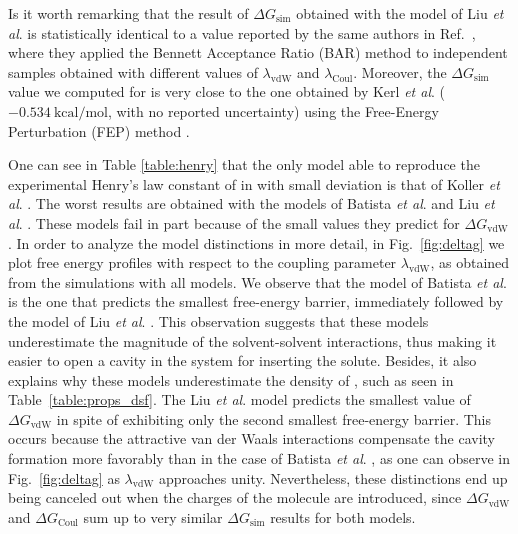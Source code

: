 \documentclass[3p,twocolumn]{elsarticle}
\begin{document}
Is it worth remarking that the result of $\Delta G_\text{sim}$ obtained with the model of Liu \textit{et al}. \cite{Liu_2014} is statistically identical to a value reported by the same authors in Ref.~, where they applied the Bennett Acceptance Ratio (BAR) method \cite{Bennett_1976} to independent samples obtained with different values of $\lambda_\text{vdW}$ and $\lambda_\text{Coul}$.
Moreover, the $\Delta G_\text{sim}$ value we computed for \ce{[emim][NTf_2]} is very close to the one obtained by Kerl \textit{et al}. \cite{Kerl__2017} ($-0.534 ~\mathrm{kcal/mol}$, with no reported uncertainty) using the Free-Energy Perturbation (FEP) method \cite{Zwanzig_1954}.

One can see in Table \ref{table:henry} that the only model able to reproduce the experimental Henry's law constant of  in \ce{[emim][B(CN)_4]} with small deviation is that of Koller \textit{et al}. \cite{Koller_2012}.
The worst results are obtained with the models of Batista \textit{et al}. \cite{Batista_2015} and Liu \textit{et al}. \cite{Liu_2014}.
These models fail in part because of the small values they predict for $\Delta G_\text{vdW}$.
In order to analyze the model distinctions in more detail, in Fig.~\ref{fig:deltag} we plot free energy profiles with respect to the coupling parameter $\lambda_\text{vdW}$, as obtained from the simulations with all \ce{[emim][B(CN)_4]} models.
We observe that the model of Batista \textit{et al}. \cite{Batista_2015} is the one that predicts the smallest free-energy barrier, immediately followed by the model of Liu \textit{et al}. \cite{Liu_2014}.
This observation suggests that these models underestimate the magnitude of the solvent-solvent interactions, thus making it easier to open a cavity in the system for inserting the solute.
Besides, it also explains why these models underestimate the density of \ce{[emim][B(CN)_4]}, such as seen in Table~\ref{table:props_dsf}.
The Liu \textit{et al}. \cite{Liu_2014} model predicts the smallest value of $\Delta G_\text{vdW}$ in spite of exhibiting only the second smallest free-energy barrier.
This occurs because the attractive van der Waals interactions compensate the cavity formation more favorably than in the case of Batista \textit{et al}. \cite{Batista_2015}, as one can observe in Fig.~\ref{fig:deltag} as $\lambda_\text{vdW}$ approaches unity.
Nevertheless, these distinctions end up being canceled out when the charges of the  molecule are introduced, since $\Delta G_\text{vdW}$ and $\Delta G_\text{Coul}$ sum up to very similar $\Delta G_\text{sim}$ results for both models.
\end{document}
